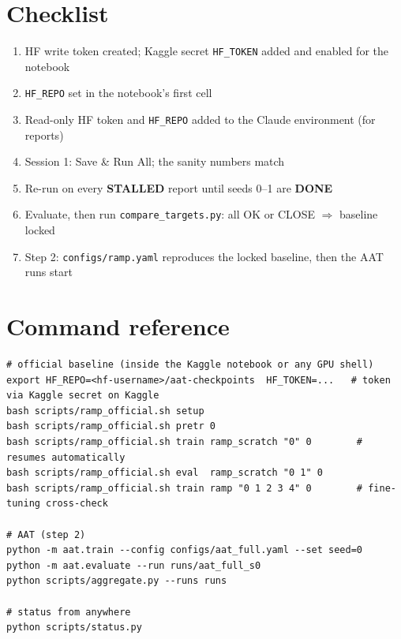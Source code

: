 \documentclass[11pt,a4paper]{article}
\newcommand{\code}[1]{\texttt{\small #1}}
\begin{document}
\section{Checklist}
\begin{enumerate}[label=$\square$]
  \item HF write token created; Kaggle secret \code{HF\_TOKEN} added and enabled for the notebook
  \item \code{HF\_REPO} set in the notebook's first cell
  \item Read-only HF token and \code{HF\_REPO} added to the Claude environment (for reports)
  \item Session 1: Save \& Run All; the sanity numbers match
  \item Re-run on every \textbf{STALLED} report until seeds 0--1 are \textbf{DONE}
  \item Evaluate, then run \code{compare\_targets.py}: all OK or CLOSE $\Rightarrow$ baseline locked
  \item Step 2: \code{configs/ramp.yaml} reproduces the locked baseline, then the AAT runs start
\end{enumerate}

\appendix
\section{Command reference}
\begin{lstlisting}
# official baseline (inside the Kaggle notebook or any GPU shell)
export HF_REPO=<hf-username>/aat-checkpoints  HF_TOKEN=...   # token via Kaggle secret on Kaggle
bash scripts/ramp_official.sh setup
bash scripts/ramp_official.sh pretr 0
bash scripts/ramp_official.sh train ramp_scratch "0" 0        # resumes automatically
bash scripts/ramp_official.sh eval  ramp_scratch "0 1" 0
bash scripts/ramp_official.sh train ramp "0 1 2 3 4" 0        # fine-tuning cross-check

# AAT (step 2)
python -m aat.train --config configs/aat_full.yaml --set seed=0
python -m aat.evaluate --run runs/aat_full_s0
python scripts/aggregate.py --runs runs

# status from anywhere
python scripts/status.py
\end{lstlisting}
\end{document}
